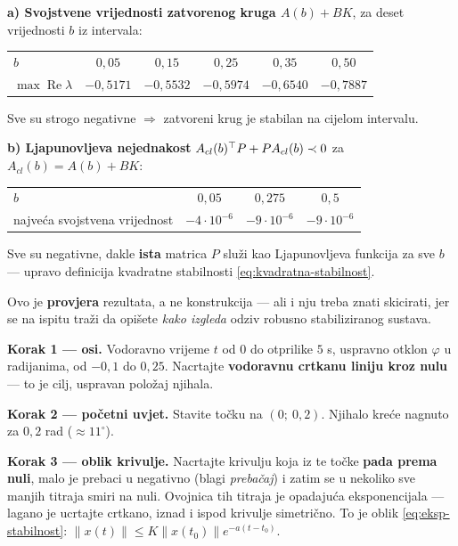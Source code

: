 \begin{zadatak}
\textbf{a) Svojstvene vrijednosti zatvorenog kruga $A(b) + BK$}, za deset
vrijednosti $b$ iz intervala:

\begin{center}
\begin{tabular}{lccccc}
\toprule
$b$ & $0{,}05$ & $0{,}15$ & $0{,}25$ & $0{,}35$ & $0{,}50$ \\
$\max\operatorname{Re}\lambda$ & $-0{,}5171$ & $-0{,}5532$ & $-0{,}5974$
  & $-0{,}6540$ & $-0{,}7887$ \\
\bottomrule
\end{tabular}
\end{center}

Sve su strogo negativne $\Rightarrow$ zatvoreni krug je stabilan na cijelom
intervalu. \checkmark

\textbf{b) Ljapunovljeva nejednakost} $A_{cl}(b)^{\top} P + PA_{cl}(b) \prec 0$ za
$A_{cl}(b) = A(b) + BK$:

\begin{center}
\begin{tabular}{lccc}
\toprule
$b$ & $0{,}05$ & $0{,}275$ & $0{,}5$ \\
najveća svojstvena vrijednost & $-4\cdot10^{-6}$ & $-9\cdot10^{-6}$
  & $-9\cdot10^{-6}$ \\
\bottomrule
\end{tabular}
\end{center}

Sve su negativne, dakle \textbf{ista} matrica $P$ služi kao Ljapunovljeva
funkcija za sve $b$ --- upravo definicija kvadratne stabilnosti
\eqref{eq:kvadratna-stabilnost}. \checkmark

\begin{crtanje}
Ovo je \textbf{provjera} rezultata, a ne konstrukcija --- ali i nju treba znati
skicirati, jer se na ispitu traži da opišete \emph{kako izgleda} odziv robusno
stabiliziranog sustava.

\textbf{Korak 1 --- osi.} Vodoravno vrijeme $t$ od $0$ do otprilike $5$ s,
uspravno otklon $\varphi$ u radijanima, od $-0{,}1$ do $0{,}25$. Nacrtajte
\textbf{vodoravnu crtkanu liniju kroz nulu} --- to je cilj, uspravan položaj
njihala.

\textbf{Korak 2 --- početni uvjet.} Stavite točku na $(0;\ 0{,}2)$. Njihalo
kreće nagnuto za $0{,}2$ rad ($\approx 11^\circ$).

\textbf{Korak 3 --- oblik krivulje.} Nacrtajte krivulju koja iz te točke
\textbf{pada prema nuli}, malo je prebaci u negativno (blagi
\emph{prebačaj}) i zatim se u nekoliko sve manjih titraja smiri na nuli. Ovojnica
tih titraja je opadajuća eksponencijala --- lagano je ucrtajte crtkano, iznad i
ispod krivulje simetrično. To je oblik \eqref{eq:eksp-stabilnost}:
$\|x(t)\| \le K\|x(t_0)\|e^{-a(t-t_0)}$.


\end{crtanje}
\end{zadatak}
